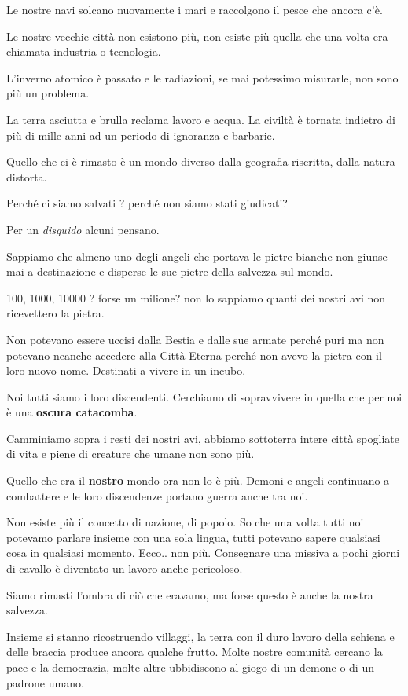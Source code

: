 \documentclass[a4paper,twoside,openany]{book}
\begin{document}
\begin{multicols}{2}
Le nostre navi solcano nuovamente i mari e raccolgono il pesce che ancora c'è.

Le nostre vecchie città non esistono più, non esiste più quella che una volta era chiamata industria o tecnologia.

L'inverno atomico è passato e le radiazioni, se mai potessimo misurarle, non sono più un problema.

La terra asciutta e brulla reclama lavoro e acqua. La civiltà è tornata indietro di più di mille anni ad un periodo di ignoranza e barbarie.

Quello che ci è rimasto è un mondo diverso dalla geografia riscritta, dalla natura distorta.

Perché ci siamo salvati ? perché non siamo stati giudicati?

Per un \textit{disguido} alcuni pensano.

Sappiamo che almeno uno degli angeli che portava le pietre bianche non giunse mai a destinazione e disperse le sue pietre della salvezza sul mondo.

100, 1000, 10000 ? forse un milione?  non lo sappiamo quanti dei nostri avi non ricevettero la pietra.

Non potevano essere uccisi dalla Bestia e dalle sue armate perché puri ma non potevano neanche accedere alla Città Eterna perché non avevo la pietra con il loro nuovo nome. Destinati a vivere in un incubo.

Noi tutti siamo i loro discendenti. Cerchiamo di sopravvivere in quella che per noi è una \textbf{oscura catacomba}.

Camminiamo sopra i resti dei nostri avi, abbiamo sottoterra intere città spogliate di vita e piene di creature che umane non sono più.

Quello che era il \textbf{nostro} mondo ora non lo è più. Demoni e angeli continuano a combattere e le loro discendenze portano guerra anche tra noi.

Non esiste più il concetto di nazione, di popolo. So che una volta tutti noi potevamo parlare insieme con una sola lingua, tutti potevano sapere qualsiasi cosa in qualsiasi momento.
Ecco.. non più. Consegnare una missiva a pochi giorni di cavallo è diventato un lavoro anche pericoloso.

Siamo rimasti l'ombra di ciò che eravamo, ma forse questo è anche la nostra salvezza.

Insieme si stanno ricostruendo villaggi, la terra con il duro lavoro della schiena e delle braccia produce ancora qualche frutto.
Molte nostre comunità cercano la pace e la democrazia, molte altre ubbidiscono al giogo di un demone o di un padrone umano.


\end{multicols}
\end{document}
